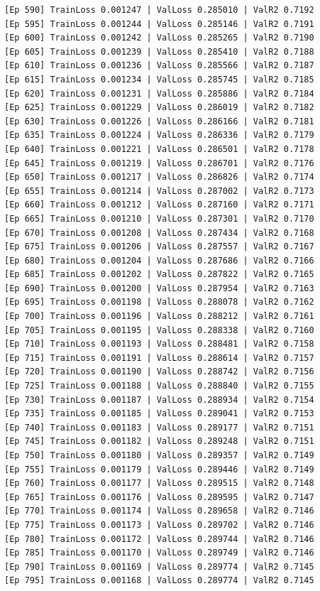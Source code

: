\documentclass[a4paper, 12pt]{article}
\begin{document}
\begin{lstlisting}
[Ep 590] TrainLoss 0.001247 | ValLoss 0.285010 | ValR2 0.7192
[Ep 595] TrainLoss 0.001244 | ValLoss 0.285146 | ValR2 0.7191
[Ep 600] TrainLoss 0.001242 | ValLoss 0.285265 | ValR2 0.7190
[Ep 605] TrainLoss 0.001239 | ValLoss 0.285410 | ValR2 0.7188
[Ep 610] TrainLoss 0.001236 | ValLoss 0.285566 | ValR2 0.7187
[Ep 615] TrainLoss 0.001234 | ValLoss 0.285745 | ValR2 0.7185
[Ep 620] TrainLoss 0.001231 | ValLoss 0.285886 | ValR2 0.7184
[Ep 625] TrainLoss 0.001229 | ValLoss 0.286019 | ValR2 0.7182
[Ep 630] TrainLoss 0.001226 | ValLoss 0.286166 | ValR2 0.7181
[Ep 635] TrainLoss 0.001224 | ValLoss 0.286336 | ValR2 0.7179
[Ep 640] TrainLoss 0.001221 | ValLoss 0.286501 | ValR2 0.7178
[Ep 645] TrainLoss 0.001219 | ValLoss 0.286701 | ValR2 0.7176
[Ep 650] TrainLoss 0.001217 | ValLoss 0.286826 | ValR2 0.7174
[Ep 655] TrainLoss 0.001214 | ValLoss 0.287002 | ValR2 0.7173
[Ep 660] TrainLoss 0.001212 | ValLoss 0.287160 | ValR2 0.7171
[Ep 665] TrainLoss 0.001210 | ValLoss 0.287301 | ValR2 0.7170
[Ep 670] TrainLoss 0.001208 | ValLoss 0.287434 | ValR2 0.7168
[Ep 675] TrainLoss 0.001206 | ValLoss 0.287557 | ValR2 0.7167
[Ep 680] TrainLoss 0.001204 | ValLoss 0.287686 | ValR2 0.7166
[Ep 685] TrainLoss 0.001202 | ValLoss 0.287822 | ValR2 0.7165
[Ep 690] TrainLoss 0.001200 | ValLoss 0.287954 | ValR2 0.7163
[Ep 695] TrainLoss 0.001198 | ValLoss 0.288078 | ValR2 0.7162
[Ep 700] TrainLoss 0.001196 | ValLoss 0.288212 | ValR2 0.7161
[Ep 705] TrainLoss 0.001195 | ValLoss 0.288338 | ValR2 0.7160
[Ep 710] TrainLoss 0.001193 | ValLoss 0.288481 | ValR2 0.7158
[Ep 715] TrainLoss 0.001191 | ValLoss 0.288614 | ValR2 0.7157
[Ep 720] TrainLoss 0.001190 | ValLoss 0.288742 | ValR2 0.7156
[Ep 725] TrainLoss 0.001188 | ValLoss 0.288840 | ValR2 0.7155
[Ep 730] TrainLoss 0.001187 | ValLoss 0.288934 | ValR2 0.7154
[Ep 735] TrainLoss 0.001185 | ValLoss 0.289041 | ValR2 0.7153
[Ep 740] TrainLoss 0.001183 | ValLoss 0.289177 | ValR2 0.7151
[Ep 745] TrainLoss 0.001182 | ValLoss 0.289248 | ValR2 0.7151
[Ep 750] TrainLoss 0.001180 | ValLoss 0.289357 | ValR2 0.7149
[Ep 755] TrainLoss 0.001179 | ValLoss 0.289446 | ValR2 0.7149
[Ep 760] TrainLoss 0.001177 | ValLoss 0.289515 | ValR2 0.7148
[Ep 765] TrainLoss 0.001176 | ValLoss 0.289595 | ValR2 0.7147
[Ep 770] TrainLoss 0.001174 | ValLoss 0.289658 | ValR2 0.7146
[Ep 775] TrainLoss 0.001173 | ValLoss 0.289702 | ValR2 0.7146
[Ep 780] TrainLoss 0.001172 | ValLoss 0.289744 | ValR2 0.7146
[Ep 785] TrainLoss 0.001170 | ValLoss 0.289749 | ValR2 0.7146
[Ep 790] TrainLoss 0.001169 | ValLoss 0.289774 | ValR2 0.7145
[Ep 795] TrainLoss 0.001168 | ValLoss 0.289774 | ValR2 0.7145

\end{lstlisting}
\end{document}
